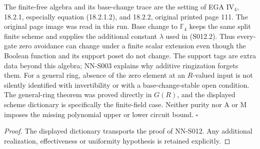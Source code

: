 \begin{geometricstatement}[NN-S012]
The finite-free algebra and its base-change trace are the setting of
EGA IV$_4$, 18.2.1, especially equation (18.2.1.2), and 18.2.2,
original printed page 111. The original page image was read in this
run. Base change to $\mathbb F_4$ keeps the same split finite scheme
and supplies the additional constant $\lambda$ used in (S012.2).
Thus every-gate zero avoidance can change under a finite scalar
extension even though the Boolean function and its support poset do
not change. The support tags are extra data beyond this algebra;
NN-S003 explains why additive ringization forgets them. For a general
ring, absence of the zero element at an $R$-valued input is not
silently identified with invertibility or with a base-change-stable
open condition. The general-ring theorem was proved directly in
$G(R)$, and the displayed scheme dictionary is specifically the
finite-field case. Neither purity nor A or M imposes the missing
polynomial upper or lower circuit bound.
\hfill$\square$
\end{geometricstatement}
\begin{proof} The displayed dictionary transports the proof of NN-S012. Any additional realization, effectiveness or uniformity hypothesis is retained explicitly.\end{proof}


